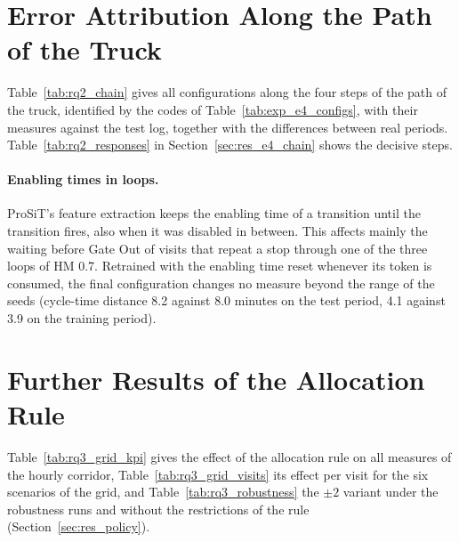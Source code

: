 \FloatBarrier
\section{Error Attribution Along the Path of the Truck}
\label{app:e4_chain}

Table~\ref{tab:rq2_chain} gives all configurations along the four steps of the path
of the truck, identified by the codes of Table~\ref{tab:exp_e4_configs}, with their
measures against the test log, together with the differences between real periods.
Table~\ref{tab:rq2_responses} in Section~\ref{sec:res_e4_chain} shows the decisive
steps.



\paragraph{Enabling times in loops.} ProSiT's feature extraction keeps the enabling
time of a transition until the transition fires, also when it was disabled in
between. This affects mainly the waiting before Gate Out of visits that repeat a stop
through one of the three loops of HM 0.7. Retrained with the enabling time reset
whenever its token is consumed, the final configuration changes no measure beyond
the range of the seeds (cycle-time distance 8.2 against 8.0 minutes on the test
period, 4.1 against 3.9 on the training period).

\FloatBarrier

\FloatBarrier
\section{Further Results of the Allocation Rule}
\label{app:s1_results}

Table~\ref{tab:rq3_grid_kpi} gives the effect of the allocation rule on all measures
of the hourly corridor, Table~\ref{tab:rq3_grid_visits} its effect per visit for the
six scenarios of the grid, and Table~\ref{tab:rq3_robustness} the $\pm 2$
variant under the robustness runs and without the restrictions of the rule
(Section~\ref{sec:res_policy}).




\FloatBarrier
